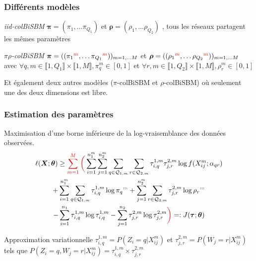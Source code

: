 \documentclass{beamer}
\begin{document}
\begin{frame}
    \frametitle{Différents modèles}
    \begin{block}{\emph{iid-colBiSBM}}
        $\bm{\pi} = (\pi_1, \dots \pi_{Q_1})$ et $\bm{\rho} = (\rho_1, \dots \rho_{Q_2})$ %
        , tous les réseaux partagent les mêmes paramètres\footnotemark
    \end{block}

    \begin{block}{\emph{$\pi\rho$-colBiSBM}}
        $\bm{\pi} = ((\pi_{\color{black}1}^{\color{red}m}, \dots \pi_{\color{black}Q_1}^{\color{red}m}))_{m=1,\dots M}$ et $\bm{\rho} = ((\rho_{\color{black}1}^{\color{red}m}, \dots \rho_{\color{black}Q_2}^{\color{red}m}))_{m=1,\dots M}$ %
        \small \\
        avec $\forall q,m \in \llbracket 1, Q_1 \rrbracket \times \llbracket 1, M \rrbracket, \pi_q^m \in \left[ 0,1 \right]$
        et $\forall r,m \in \llbracket 1, Q_2 \rrbracket \times \llbracket 1, M \rrbracket, \rho_r^m \in \left[ 0,1 \right]$
    \end{block}
    Et également deux autres modèles ($\pi$-colBiSBM et $\rho$-colBiSBM) où seulement une des deux dimensions est libre.
\end{frame}
\begin{frame}
    \frametitle{Estimation des paramètres}
    Maximisation d'une borne inférieure de la log-vraisemblance des données observées.
    \begin{multline*}
        \ell (\bm{X};\bm{\theta}) \geq \color{red}\sum_{m=1}^{M} \bigg( \color{black} \sum_{i = 1}^{n_1^m}\sum_{j=1}^{n_2^m}\sum_{q \in \mathcal{Q}_{1,m}} \sum_{r \in \mathcal{Q}_{2,m}} \tau^{1,m}_{i,q} \tau^{2,m}_{j,r} \log f(X^{m}_{ij}; \alpha_{qr}) \\
        + \sum_{i=1}^{n_1^m} \sum_{q \in \mathcal{Q}_{1,m}} \tau^{1,m}_{i,q} \log \pi_{\color{black}q}^{\color{gray}m} + \sum_{j=1}^{n_2^m} \sum_{r \in \mathcal{Q}_{2,m}} \tau^{2,m}_{j,r} \log \rho_{\color{black}r}^{\color{gray}m} \\
        - \sum_{i=1}^{n_1} \tau^{1,m}_{i,q} \log \tau^{1,m}_{i,q} - \sum_{j=1}^{n_2} \tau^{2,m}_{j,r} \log \tau^{2,m}_{j,r} \color{red}\bigg) \color{black} =: J(\bm{\tau};\bm{\theta}) $$
    \end{multline*}

    \begin{block}{Approximation variationnelle}
        $\tau_{i,q}^{1,m} = P(Z_i = q | X^m_{ij})$ et $\tau_{j,r}^{2,m} = P(W_j = r | X^m_{ij})$ tels que $P(Z_i = q, W_j = r | X^m_{ij}) = \tau_{i,q}^{1,m}\times\tau_{j,r}^{2,m}$
    \end{block}

\end{frame}
\end{document}
